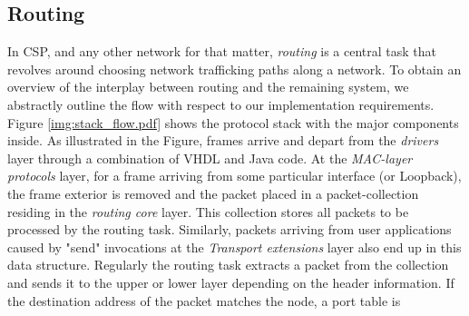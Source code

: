 \subsection{Routing}
In CSP, and any other network for that matter, \textit{routing} is a central task that revolves around choosing network trafficking paths along a network. To obtain an overview of the interplay between routing and the remaining system, we abstractly outline the flow with respect to our implementation requirements. Figure \ref{img:stack_flow.pdf} shows the protocol stack with the major components inside. As illustrated in the Figure, frames arrive and depart from the \textit{drivers} layer through a combination of VHDL and Java code. At the \textit{MAC-layer protocols} layer, for a frame arriving from some particular interface (\iic or Loopback), the frame exterior is removed and the packet placed in a packet-collection residing in the \textit{routing core} layer. This collection stores all packets to be processed by the routing task. Similarly, packets arriving from user applications caused by "send" invocations at the \textit{Transport extensions} layer also end up in this data structure. Regularly the routing task extracts a packet from the collection and sends it to the upper or lower layer depending on the header information. If the destination address of the packet matches the node, a port table is  



